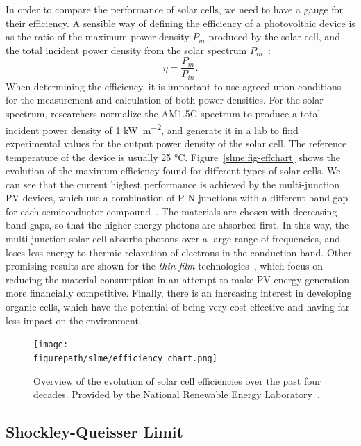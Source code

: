 \begin{refsection}
In order to compare the performance of solar cells, we need to have a gauge 
for their efficiency. A sensible way of defining the efficiency of a 
photovoltaic device is as the ratio of the maximum power density $P_m$ 
produced by the solar cell, and the total incident power density from the 
solar spectrum $P_{in}$~\cite{Fonash2010}: 
\begin{equation} 
\eta = \frac{P_m}{P_{in}}. 
\end{equation} 
When determining the efficiency, it is important to use agreed upon conditions 
for the measurement and calculation of both power densities. For the solar spectrum, 
researchers normalize the \gls{AM}1.5G spectrum to produce a total incident power 
density of 1 \si{\kilo\watt \per \meter\squared}, and generate it in a lab to find 
experimental values for the output power density of the solar cell. The 
reference temperature of the device is usually 25 \si{\celsius}. 
Figure~\ref{slme:fig-effchart} shows the evolution of the maximum efficiency 
found for different types of solar cells. We can see that the current highest 
performance is achieved by the multi-junction \gls{PV} devices, which use a 
combination of P-N junctions with a different band gap for each semiconductor 
compound~\cite{Dimroth2007}. The materials are chosen with decreasing band 
gaps, so that the higher energy photons are absorbed first. In this way, the 
multi-junction solar cell absorbs photons over a large range of frequencies, 
and loses less energy to thermic relaxation of electrons in the conduction 
band. Other promising results are shown for the \textit{thin film} 
technologies~\cite{Shah2004}, which focus on reducing the material consumption 
in an attempt to make \gls{PV} energy generation more financially competitive. 
Finally, there is an increasing interest in developing organic cells, which 
have the potential of being very cost effective and having far less impact on 
the environment. 

\begin{figure}
    \centering
    \texttt{[image: \\figurepath/slme/efficiency\_chart.png]} 
    \caption{\label{slme:fig-effchart} Overview of the evolution of solar cell 
efficiencies over the past four decades. Provided by the National Renewable Energy Laboratory~\cite{NREL2019}.} 
    \label{fig:awesome_image}
\end{figure}

\subsection{Shockley-Queisser Limit} \label{slme:sec-SQlimit} 
 

\end{refsection}
